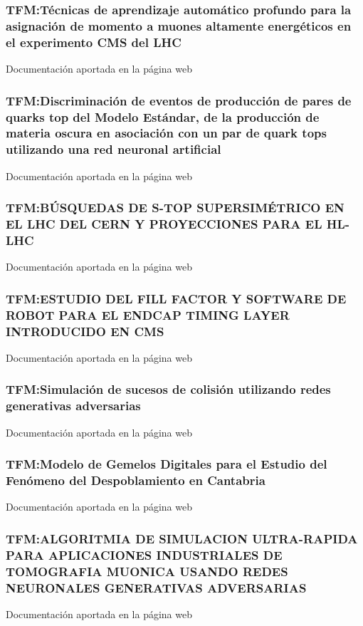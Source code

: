 \documentclass[a4paper, 11pt, twoside, openright]{report}
\begin{document}
\subsubsection{TFM:Técnicas de aprendizaje automático profundo para la asignación de momento a muones altamente energéticos en el experimento CMS del LHC}
Documentación aportada en la página web

\subsubsection{TFM:Discriminación de eventos de producción de pares de quarks top del Modelo Estándar, de la producción de materia oscura en asociación con un par de quark tops utilizando una red neuronal artificial}
Documentación aportada en la página web

\subsubsection{TFM:BÚSQUEDAS DE S-TOP SUPERSIMÉTRICO EN EL LHC DEL CERN Y PROYECCIONES PARA EL HL-LHC}
Documentación aportada en la página web

\subsubsection{TFM:ESTUDIO DEL FILL FACTOR Y SOFTWARE DE ROBOT PARA EL ENDCAP TIMING LAYER INTRODUCIDO EN CMS}
Documentación aportada en la página web

\subsubsection{TFM:Simulación de sucesos de colisión utilizando redes generativas adversarias}
Documentación aportada en la página web

\subsubsection{TFM:Modelo de Gemelos Digitales para el Estudio del Fenómeno del Despoblamiento en Cantabria}
Documentación aportada en la página web

\subsubsection{TFM:ALGORITMIA DE SIMULACION ULTRA-RAPIDA PARA APLICACIONES INDUSTRIALES DE TOMOGRAFIA MUONICA USANDO REDES NEURONALES GENERATIVAS ADVERSARIAS}
Documentación aportada en la página web
\end{document}
